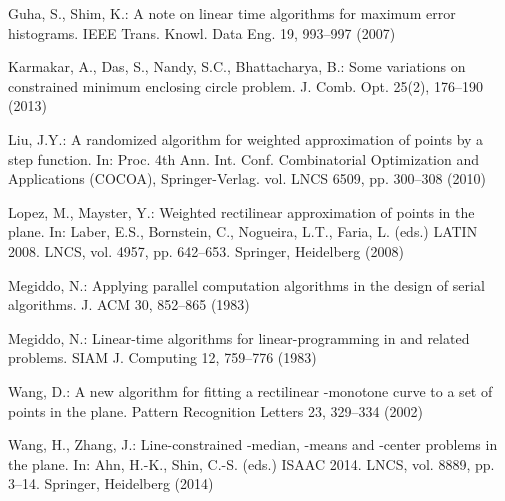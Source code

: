 \documentclass[preprint,10pt]{elsarticle}
\begin{document}
\begin{thebibliography}{10}
Guha, S., Shim, K.: A note on linear time algorithms for maximum error
  histograms. IEEE Trans. Knowl. Data Eng.  19,  993--997 (2007)

Karmakar, A., Das, S., Nandy, S.C., Bhattacharya, B.: Some variations on
  constrained minimum enclosing circle problem. J. Comb. Opt.  25(2),  176--190
  (2013)

Liu, J.Y.: A randomized algorithm for weighted approximation of points by a
  step function. In: Proc. 4th Ann. Int. Conf. Combinatorial Optimization and
  Applications (COCOA), Springer-Verlag. vol. LNCS 6509, pp. 300--308 (2010)

Lopez, M., Mayster, Y.: Weighted rectilinear approximation of points in the
  plane. In: Laber, E.S., Bornstein, C., Nogueira, L.T., Faria, L. (eds.) LATIN 2008.
LNCS, vol. 4957, pp. 642--653. Springer, Heidelberg (2008)

Megiddo, N.: Applying parallel computation algorithms in the design of serial
  algorithms. J. ACM  30,  852--865 (1983)

Megiddo, N.: Linear-time algorithms for linear-programming in  and
  related problems. SIAM J. Computing  12,  759--776 (1983)

Wang, D.: A new algorithm for fitting a rectilinear -monotone curve to a set
  of points in the plane. Pattern Recognition Letters  23,  329--334 (2002)

Wang, H., Zhang, J.: Line-constrained -median, -means and -center
  problems in the plane. In: Ahn, H.-K., Shin, C.-S. (eds.) ISAAC 2014. LNCS,
  vol. 8889, pp. 3--14. Springer, Heidelberg (2014)

\end{thebibliography}
\end{document}
